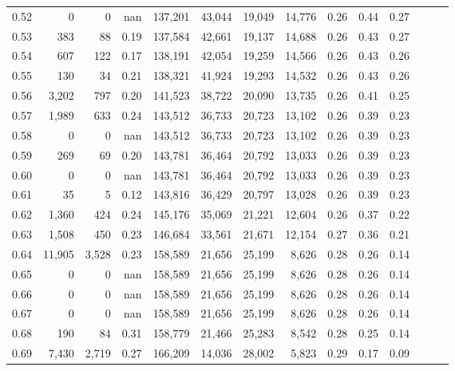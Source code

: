 \begin{tabular}{rrrrrrrrrrrrrr}
0.52 &       0 &      0 &   nan &  137,201 &   43,044 &  19,049 &  14,776 &  0.26 &  0.44 &      0.27 \\
0.53 &     383 &     88 &  0.19 &  137,584 &   42,661 &  19,137 &  14,688 &  0.26 &  0.43 &      0.27 \\
0.54 &     607 &    122 &  0.17 &  138,191 &   42,054 &  19,259 &  14,566 &  0.26 &  0.43 &      0.26 \\
0.55 &     130 &     34 &  0.21 &  138,321 &   41,924 &  19,293 &  14,532 &  0.26 &  0.43 &      0.26 \\
0.56 &   3,202 &    797 &  0.20 &  141,523 &   38,722 &  20,090 &  13,735 &  0.26 &  0.41 &      0.25 \\
0.57 &   1,989 &    633 &  0.24 &  143,512 &   36,733 &  20,723 &  13,102 &  0.26 &  0.39 &      0.23 \\
0.58 &       0 &      0 &   nan &  143,512 &   36,733 &  20,723 &  13,102 &  0.26 &  0.39 &      0.23 \\
0.59 &     269 &     69 &  0.20 &  143,781 &   36,464 &  20,792 &  13,033 &  0.26 &  0.39 &      0.23 \\
0.60 &       0 &      0 &   nan &  143,781 &   36,464 &  20,792 &  13,033 &  0.26 &  0.39 &      0.23 \\
0.61 &      35 &      5 &  0.12 &  143,816 &   36,429 &  20,797 &  13,028 &  0.26 &  0.39 &      0.23 \\
0.62 &   1,360 &    424 &  0.24 &  145,176 &   35,069 &  21,221 &  12,604 &  0.26 &  0.37 &      0.22 \\
0.63 &   1,508 &    450 &  0.23 &  146,684 &   33,561 &  21,671 &  12,154 &  0.27 &  0.36 &      0.21 \\
0.64 &  11,905 &  3,528 &  0.23 &  158,589 &   21,656 &  25,199 &   8,626 &  0.28 &  0.26 &      0.14 \\
0.65 &       0 &      0 &   nan &  158,589 &   21,656 &  25,199 &   8,626 &  0.28 &  0.26 &      0.14 \\
0.66 &       0 &      0 &   nan &  158,589 &   21,656 &  25,199 &   8,626 &  0.28 &  0.26 &      0.14 \\
0.67 &       0 &      0 &   nan &  158,589 &   21,656 &  25,199 &   8,626 &  0.28 &  0.26 &      0.14 \\
0.68 &     190 &     84 &  0.31 &  158,779 &   21,466 &  25,283 &   8,542 &  0.28 &  0.25 &      0.14 \\
0.69 &   7,430 &  2,719 &  0.27 &  166,209 &   14,036 &  28,002 &   5,823 &  0.29 &  0.17 &      0.09 \\

\end{tabular}
